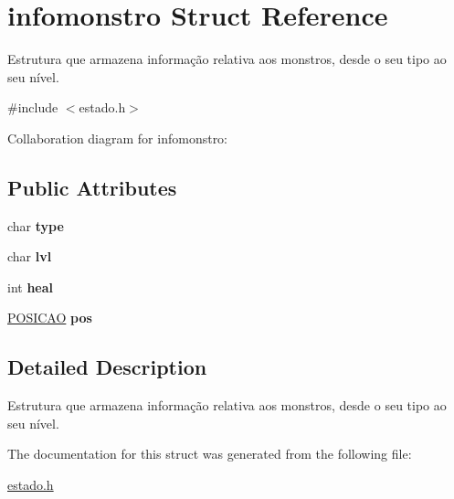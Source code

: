 \hypertarget{structinfomonstro}{}\section{infomonstro Struct Reference}
\label{structinfomonstro}


Estrutura que armazena informação relativa aos monstros, desde o seu tipo ao seu nível.  




{\ttfamily \#include $<$estado.\+h$>$}



Collaboration diagram for infomonstro\+:
\subsection*{Public Attributes}
\begin{DoxyCompactItemize}
\item 
char {\bfseries type}\hypertarget{structinfomonstro_a389654d161c69ab632bba2e8ef727c4a}{}\label{structinfomonstro_a389654d161c69ab632bba2e8ef727c4a}

\item 
char {\bfseries lvl}\hypertarget{structinfomonstro_a2b208eefcbef564ceb1b647845d2eb41}{}\label{structinfomonstro_a2b208eefcbef564ceb1b647845d2eb41}

\item 
int {\bfseries heal}\hypertarget{structinfomonstro_a2631874920708141dc22d3e100feca32}{}\label{structinfomonstro_a2631874920708141dc22d3e100feca32}

\item 
\hyperlink{estado_8h_a55b3f4b56938eeb8fa5e8f9c07baf1b0}{P\+O\+S\+I\+C\+AO} {\bfseries pos}\hypertarget{structinfomonstro_a6805759bef87fef58f57484f26db0174}{}\label{structinfomonstro_a6805759bef87fef58f57484f26db0174}

\end{DoxyCompactItemize}


\subsection{Detailed Description}
Estrutura que armazena informação relativa aos monstros, desde o seu tipo ao seu nível. 

The documentation for this struct was generated from the following file\+:\begin{DoxyCompactItemize}
\item 
\hyperlink{estado_8h}{estado.\+h}\end{DoxyCompactItemize}
